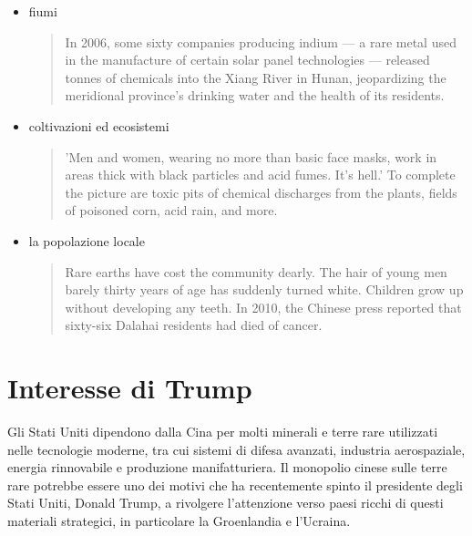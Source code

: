 \documentclass[12pt,a4paper,oneside]{book}
\begin{document}
\begin{itemize}
\item fiumi
\begin{quote}
\small
In 2006, some sixty companies producing indium — a rare metal used in the manufacture of certain solar panel technologies — released tonnes of chemicals into the Xiang River in Hunan, jeopardizing the meridional province's drinking water and the health of its residents. \citep[p. 25]{pitron2020rare}
\end{quote}

\item coltivazioni ed ecosistemi
\begin{quote}
\small
'Men and women, wearing no more than basic face masks, work in areas thick with black particles and acid fumes. It's hell.' To complete the picture are toxic pits of chemical discharges from the plants, fields of poisoned corn, acid rain, and more. \citep[p. 26]{pitron2020rare}
\end{quote}

\item la popolazione locale
\begin{quote}
\small
Rare earths have cost the community dearly. The hair of young men barely thirty years of age has suddenly turned white. Children grow up without developing any teeth. In 2010, the Chinese press reported that sixty-six Dalahai residents had died of cancer. \citep[p. 29]{pitron2020rare}
\end{quote}

\end{itemize}

\section{Interesse di Trump}

Gli Stati Uniti dipendono dalla Cina per molti minerali e terre rare utilizzati nelle tecnologie moderne, tra cui sistemi di difesa avanzati, industria aerospaziale, energia rinnovabile e produzione manifatturiera.
Il monopolio cinese sulle terre rare potrebbe essere uno dei motivi che ha recentemente spinto il presidente degli Stati Uniti, Donald Trump, a rivolgere l'attenzione verso paesi ricchi di questi materiali strategici, in particolare la Groenlandia e l'Ucraina.
\end{document}
